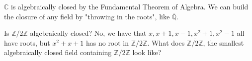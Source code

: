 \begin{remark}
    \(\mathbb{C} \) is algebraically closed by the Fundamental Theorem of Algebra. We can build the closure of any field by "throwing in the roots", like \(\overline{\mathbb{Q}} \).
\end{remark}
\begin{eg}
	Is \(\mathbb{Z} /2\mathbb{Z} \) algebraically closed? No, we have that \(x, x+1, x-1, x^2 +1, x^2 -1\) all have roots, but \(x^2 +x+1\) has no root in \(\mathbb{Z} /2\mathbb{Z} \). What does \(\overline{\mathbb{Z} /2\mathbb{Z} } \), the smallest algebraically closed field containing \(\mathbb{Z} /2\mathbb{Z} \) look like?     
\end{eg}

